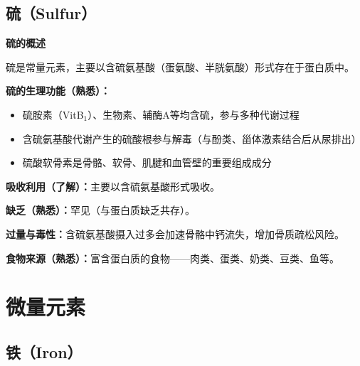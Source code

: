 \subsection{硫（Sulfur）}

\begin{tipbox}
\textbf{硫的概述}

硫是常量元素，主要以含硫氨基酸（蛋氨酸、半胱氨酸）形式存在于蛋白质中。

\textbf{硫的生理功能（熟悉）：}
\begin{itemize}[leftmargin=*]
    \item 硫胺素（VitB$_1$）、生物素、辅酶A等均含硫，参与多种代谢过程
    \item 含硫氨基酸代谢产生的硫酸根参与解毒（与酚类、甾体激素结合后从尿排出）
    \item 硫酸软骨素是骨骼、软骨、肌腱和血管壁的重要组成成分
\end{itemize}

\textbf{吸收利用（了解）：}主要以含硫氨基酸形式吸收。

\textbf{缺乏（熟悉）：}罕见（与蛋白质缺乏共存）。

\textbf{过量与毒性：}含硫氨基酸摄入过多会加速骨骼中钙流失，增加骨质疏松风险。

\textbf{食物来源（熟悉）：}富含蛋白质的食物——肉类、蛋类、奶类、豆类、鱼等。
\end{tipbox}

\section{微量元素}

\subsection{铁（Iron）}

